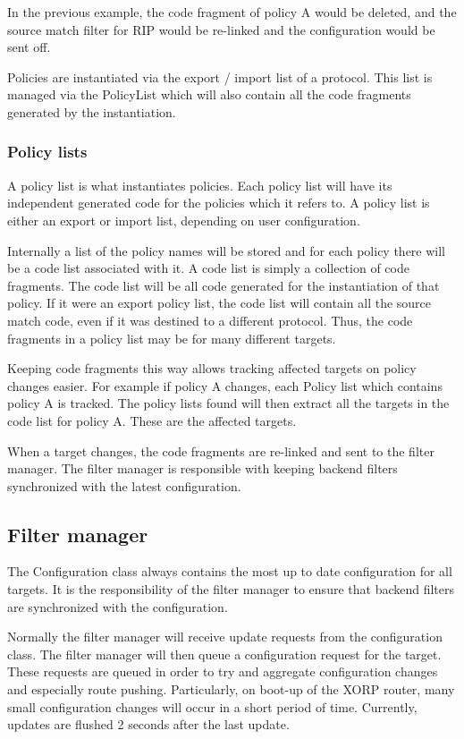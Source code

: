 \documentclass{article}
\begin{document}
In the previous example, the code fragment of policy A would be deleted, and the
source match filter for RIP would be re-linked and the configuration would be
sent off.

Policies are instantiated via the export / import list of a protocol. This list
is managed via the PolicyList which will also contain all the code fragments
generated by the instantiation.

\subsubsection{Policy lists}
A policy list is what instantiates policies. Each policy list will have its
independent generated code for the policies which it refers to. A policy list is
either an export or import list, depending on user configuration.

Internally a list of the policy names will be stored and for each policy there
will be a code list associated with it. A code list is simply a collection of
code fragments. The code list will be all code generated for the instantiation
of that policy. If it were an export policy list, the code list will contain all
the source match code, even if it was destined to a different protocol.
Thus, the code fragments in a policy list may be for many different targets.

Keeping code fragments this way allows tracking affected targets on policy
changes easier.  For example if policy A changes, each Policy list which
contains policy A is tracked. The policy lists found will then extract all the
targets in the code list for policy A. These are the affected targets.

When a target changes, the code fragments are re-linked and sent to the filter
manager. The filter manager is responsible with keeping backend filters synchronized
with the latest configuration.

\subsection{Filter manager}
The Configuration class always contains the most up to date configuration for
all targets. It is the responsibility of the filter manager to ensure that
backend filters are synchronized with the configuration.

Normally the filter manager will receive update requests from the configuration
class. The filter manager will then queue a configuration request for the
target. These requests are queued in order to try and aggregate configuration
changes and especially route pushing. Particularly, on boot-up of the XORP router,
many small configuration changes will occur in a short period of time.
Currently, updates are flushed 2 seconds after the last update.
\end{document}
